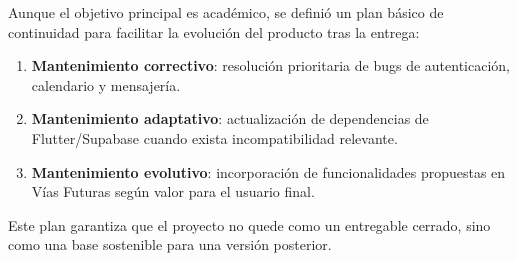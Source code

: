 Aunque el objetivo principal es académico, se definió un plan básico de continuidad para facilitar la evolución del producto tras la entrega:

\begin{enumerate}
  \item \textbf{Mantenimiento correctivo}: resolución prioritaria de bugs de autenticación, calendario y mensajería.
  \item \textbf{Mantenimiento adaptativo}: actualización de dependencias de Flutter/Supabase cuando exista incompatibilidad relevante.
  \item \textbf{Mantenimiento evolutivo}: incorporación de funcionalidades propuestas en Vías Futuras según valor para el usuario final.
\end{enumerate}

Este plan garantiza que el proyecto no quede como un entregable cerrado, sino como una base sostenible para una versión posterior.
